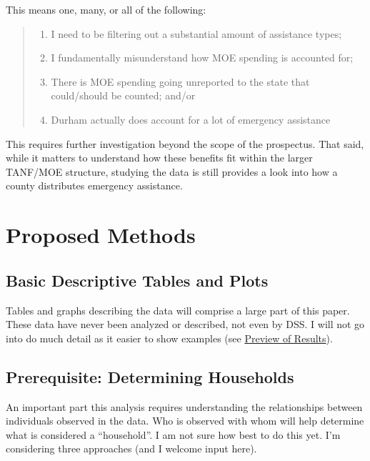 \documentclass[12pt,letterpaperpaper,]{book}
\providecommand{\tightlist}{%
  \setlength{\itemsep}{0pt}\setlength{\parskip}{0pt}}
\begin{document}
This means one, many, or all of the following:

\begin{quote}
\begin{enumerate}
\def\labelenumi{(\arabic{enumi})}
\tightlist
\item
  I need to be filtering out a substantial amount of assistance types;
\item
  I fundamentally misunderstand how MOE spending is accounted for;
\item
  There is MOE spending going unreported to the state that could/should
  be counted; and/or
\item
  Durham actually does account for a lot of emergency assistance
\end{enumerate}
\end{quote}

This requires further investigation beyond the scope of the prospectus.
That said, while it matters to understand how these benefits fit within
the larger TANF/MOE structure, studying the data is still provides a
look into how a county distributes emergency assistance.

\hypertarget{methods-3}{\section*{Proposed Methods}\label{methods-3}}

\subsection*{Basic Descriptive Tables and
Plots}\label{basic-descriptive-tables-and-plots}

Tables and graphs describing the data will comprise a large part of this
paper. These data have never been analyzed or described, not even by
DSS. I will not go into do much detail as it easier to show examples
(see \protect\hyperlink{preview-3}{Preview of Results}).

\subsection*{Prerequisite: Determining
Households}\label{prerequisite-determining-households}

An important part this analysis requires understanding the relationships
between individuals observed in the data. Who is observed with whom will
help determine what is considered a ``household''. I am not sure how
best to do this yet. I'm considering three approaches (and I welcome
input here).
\end{document}
